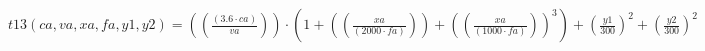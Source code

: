 \documentclass[preview,border=1pt]{standalone}
\begin{document}
$
t13 (ca,va,xa,fa,y1,y2) = \left(\left(\frac{\left(\num{3.6}\cdot ca\right)}{va}\right)\right)\cdot \left(\num{1}+\left(\left(\frac{xa}{\left(\num{2000}\cdot fa\right)}\right)\right)+\left(\left(\frac{xa}{\left(\num{1000}\cdot fa\right)}\right)\right)^{\num{3}}\right)+\left(\frac{y1}{\num{300}}\right)^{\num{2}}+\left(\frac{y2}{\num{300}}\right)^{\num{2}}
$
\end{document}
